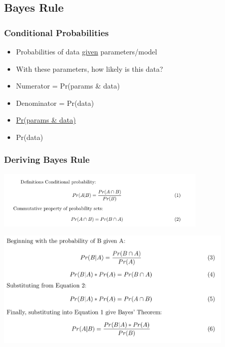 \documentclass[14pt,handout]{beamer}
\begin{document}
\subsection{Bayes Rule}

\begin{frame}
\frametitle{Conditional Probabilities}
\begin{itemize}
	\item<+-> Probabilities of data \underline{given} parameters/model
	\item<+-> With these parameters, how likely is this data?
	\item<+-> Numerator = Pr(params \& data)
	\item<+-> Denominator = Pr(data)
	\item<+->[] \underline{Pr(params \& data)}
	\item<+->[] Pr(data)
\end{itemize}
\end{frame}

\begin{frame}
\frametitle{Deriving Bayes Rule}
	\begin{center}
	\includegraphics[width=0.75\textwidth]{images_20171130_bayes_1and2.png}
	\end{center}
	\begin{center}
	\includegraphics[width=0.85\textwidth]{images_20171130_bayes.png}
	\end{center}
\end{frame}
\end{document}
